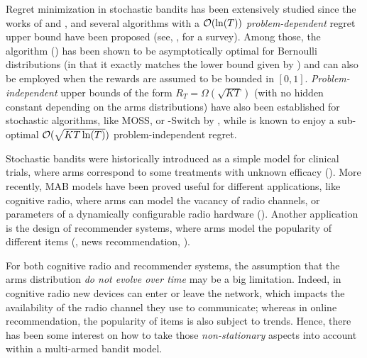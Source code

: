 Regret minimization in stochastic bandits has been extensively studied since the works of \cite{Robbins52} and \cite{LaiRobbins85}, and several algorithms with a $\mathcal{O}(\ln(T))$ \emph{problem-dependent} regret upper bound have been proposed (see, \eg, \cite{LattimoreBanditAlgorithmsBook} for a survey). Among those, the \klUCB{} algorithm (\cite{KLUCBJournal}) has been shown to be asymptotically optimal for Bernoulli distributions (in that it exactly matches the lower bound given by \cite{LaiRobbins85}) and can also be employed when the rewards are assumed to be bounded in $[0,1]$.
\emph{Problem-independent} upper bounds of the form $R_T=\Omega(\sqrt{KT})$ (with no hidden constant depending on the arms distributions) have also been established for stochastic algorithms, like MOSS, or \klUCB-Switch by \cite{Garivier18}, while \klUCB{} is known to enjoy a sub-optimal $\mathcal{O}(\sqrt{KT\ln(T)})$ problem-independent regret.

Stochastic bandits were historically introduced as a simple model for clinical trials, where arms correspond to some treatments with unknown efficacy (\cite{Thompson33}). More recently, MAB models have been proved useful for different applications, like cognitive radio, where arms can model the vacancy of radio channels, or parameters of a dynamically configurable radio hardware (\cite{Maghsudi16,Bonnefoi17,KerkoucheAlami18}). Another application is the design of recommender systems, where arms model the popularity of different items (\eg, news recommendation, \cite{Li10}).

For both cognitive radio and recommender systems, the assumption that the arms distribution \emph{do not evolve over time} may be a big limitation. Indeed, in cognitive radio new devices can enter or leave the network, which impacts the availability of the radio channel they use to communicate; whereas in online recommendation, the popularity of items is also subject to trends. Hence, there has been some interest on how to take those \emph{non-stationary} aspects into account within a multi-armed bandit model.

